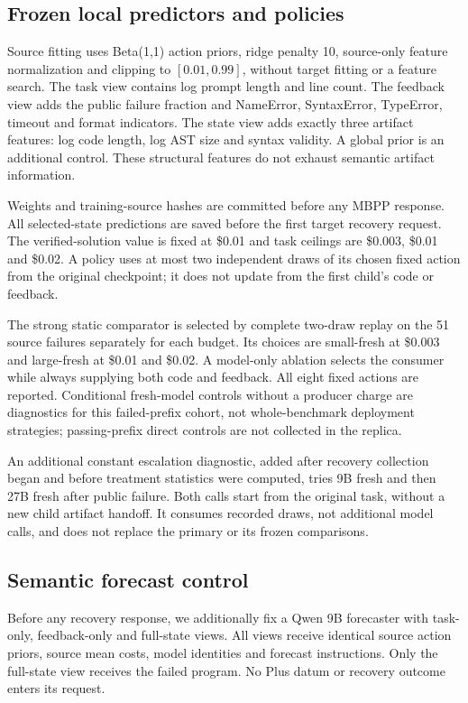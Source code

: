 \documentclass[10pt,twocolumn]{article}
\begin{document}
\subsection{Frozen local predictors and policies}

Source fitting uses Beta(1,1) action priors, ridge penalty 10, source-only feature
normalization and clipping to $[0.01,0.99]$, without target fitting or a feature
search. The task view contains log prompt length and line count. The feedback
view adds the public failure fraction and NameError, SyntaxError, TypeError,
timeout and format indicators. The state view adds exactly three artifact
features: log code length, log AST size and syntax validity. A global prior is an
additional control. These structural features do not exhaust semantic artifact
information.

Weights and training-source hashes are committed before any MBPP response.
All selected-state predictions are saved before the first target recovery
request. The verified-solution value is fixed at \$0.01 and task ceilings are
\$0.003, \$0.01 and \$0.02. A policy uses at most two independent draws of its
chosen fixed action from the original checkpoint; it does not update from the
first child's code or feedback.

The strong static comparator is selected by complete two-draw replay on the
51 source failures separately for each budget. Its choices are small-fresh at
\$0.003 and large-fresh at \$0.01 and \$0.02. A model-only ablation selects the
consumer while always supplying both code and feedback. All eight fixed actions
are reported. Conditional fresh-model controls without a producer charge are
diagnostics for this failed-prefix cohort, not whole-benchmark deployment
strategies; passing-prefix direct controls are not collected in the replica.

An additional constant escalation diagnostic, added after recovery collection
began and before treatment statistics were computed, tries 9B fresh and then
27B fresh after public failure. Both calls start from the original task, without
a new child artifact handoff. It consumes recorded draws, not additional model
calls, and does not replace the primary or its frozen comparisons.

\subsection{Semantic forecast control}

Before any recovery response, we additionally fix a Qwen 9B forecaster with
task-only, feedback-only and full-state views. All views receive identical
source action priors, source mean costs, model identities and forecast
instructions. Only the full-state view receives the failed program. No Plus
datum or recovery outcome enters its request.
\end{document}

